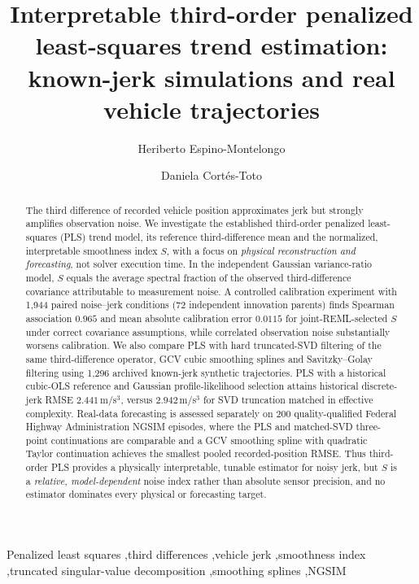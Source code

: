 \documentclass[a4paper,fleqn]{cas-dc}
\begin{document}
\let\WriteBookmarks\relax
\def\floatpagepagefraction{1}
\def\textpagefraction{.001}
\title[mode=title]{Interpretable third-order penalized least-squares trend estimation: known-jerk simulations and real vehicle trajectories}
\author[1]{Heriberto Espino-Montelongo}
\author[1]{Daniela Cort\'es-Toto}
\begin{abstract}
The third difference of recorded vehicle position approximates jerk but strongly amplifies observation noise. We investigate the established third-order penalized least-squares (PLS) trend model, its reference third-difference mean and the normalized, interpretable smoothness index $S$, with a focus on \emph{physical reconstruction and forecasting}, not solver execution time. In the independent Gaussian variance-ratio model, $S$ equals the average spectral fraction of the observed third-difference covariance attributable to measurement noise. A controlled calibration experiment with 1,944 paired noise--jerk conditions (72 independent innovation parents) finds Spearman association $0.965$ and mean absolute calibration error $0.0115$ for joint-REML-selected $S$ under correct covariance assumptions, while correlated observation noise substantially worsens calibration. We also compare PLS with hard truncated-SVD filtering of the same third-difference operator, GCV cubic smoothing splines and Savitzky--Golay filtering using 1,296 archived known-jerk synthetic trajectories. PLS with a historical cubic-OLS reference and Gaussian profile-likelihood selection attains historical discrete-jerk RMSE $2.441$\,m/s$^3$, versus $2.942$\,m/s$^3$ for SVD truncation matched in effective complexity. Real-data forecasting is assessed separately on 200 quality-qualified Federal Highway Administration NGSIM episodes, where the PLS and matched-SVD three-point continuations are comparable and a GCV smoothing spline with quadratic Taylor continuation achieves the smallest pooled recorded-position RMSE. Thus third-order PLS provides a physically interpretable, tunable estimator for noisy jerk, but $S$ is a \emph{relative, model-dependent} noise index rather than absolute sensor precision, and no estimator dominates every physical or forecasting target.
\end{abstract}\begin{keywords}
Penalized least squares \sep third differences \sep vehicle jerk \sep smoothness index \sep truncated singular-value decomposition \sep smoothing splines \sep NGSIM
\end{keywords}
\maketitle








\end{document}
